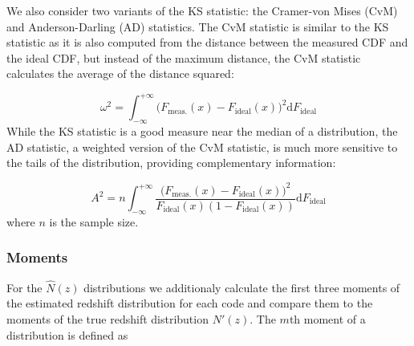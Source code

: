 We also consider two variants of the KS statistic: the Cramer-von Mises (CvM) and Anderson-Darling (AD) statistics.
The CvM statistic is similar to the KS statistic as it is also computed from the distance between the measured CDF and the ideal CDF, but instead of the maximum distance, the CvM statistic calculates the average of the distance squared:

\begin{equation}
\label{eq:cvm}
\omega^2 = \int_{-\infty}^{+\infty}\big(F_{\mathrm{meas.}}(x) - F_{\mathrm{ideal}}(x)\big)^2\mathrm{d}F_{\mathrm{ideal}}
\end{equation}
While the KS statistic is a good measure near the median of a distribution, the AD statistic, a weighted version of the CvM statistic, is much more sensitive to the tails of the distribution, providing complementary information:

\begin{equation} \label{eq:ad}
A^2 = n\int_{-\infty}^{+\infty} \frac{\big(F_{\mathrm{meas.}}(x) - F_{\mathrm{ideal}}(x)\big)^2} {F_{\mathrm{ideal}}(x) (1-F_{\mathrm{ideal}}(x))}\mathrm{d}F_{\mathrm{ideal}}
\end{equation}
where $n$ is the sample size.

%


\subsubsection{Moments}
\label{sec:moments}
For the $\hat{N}(z)$ distributions we additionaly calculate the first three moments of the estimated redshift distribution for each code and compare them to the moments of the true redshift distribution $N'(z)$.
The $m$th moment of a distribution is defined as

